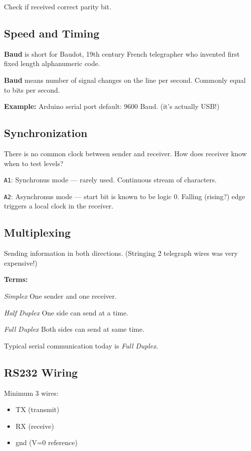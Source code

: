 \documentclass{article}	%
\begin{document}
Check if received correct parity bit. 


\subsection{Speed and Timing}

{\bf Baud} is short for Baudot, 19th century
French telegrapher who invented first fixed length
alphanumeric code.

{\bf Baud} means number of signal changes on the
line per second.  Commonly equal to bits per second.

{\bf Example: }  Arduino serial port default: 9600 Baud. (it's actually USB!)


\subsection{Synchronization}
There is no common clock between sender and
receiver. How does receiver know when to test
levels?

\noindent
{\tt A1}: Synchronus mode --- rarely used.  Continuous
stream of characters.

\noindent
{\tt A2}: Asynchronus mode --- start bit is known
to be logic 0.  Falling (rising?) edge triggers
a local clock in the receiver.


\subsection{Multiplexing}
Sending information in both directions.  (Stringing 2 telegraph wires was very expensive!)

{\bf Terms:}

{\it Simplex}  One sender and one receiver.

{\it Half Duplex} One side can send at a time.

{\it Full Duplex} Both sides can send at same time.

Typical serial communication today is {\it Full Duplex}.
\subsection{RS232 Wiring}

Minimum 3 wires:
\begin{itemize}
        \item TX  (transmit)
        \item RX  (receive)
        \item gnd  (V=0 reference)
\end{itemize}
\end{document}
